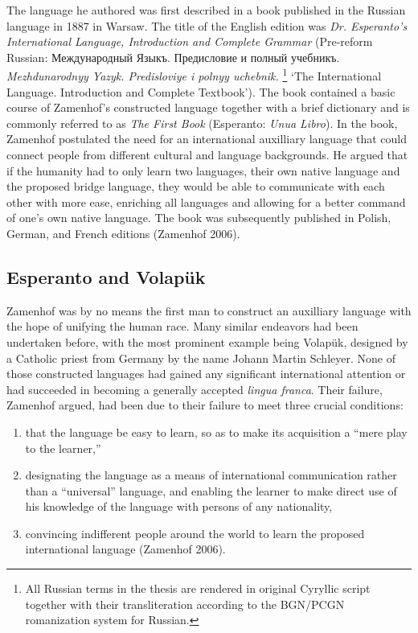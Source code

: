 The language he authored was first described in a book published in the Russian language in 1887 in Warsaw. The title of the English edition was \textit{Dr. Esperanto's International Language, Introduction and Complete Grammar} (Pre-reform Russian: Между\-на\-род\-ный Языкъ. Предисловие и полный учебникъ. \textit{Mezhdunarodnyy Yazyk. Predisloviye i polnyy uchebnik.}%
\footnote{All Russian terms in the thesis are rendered in original Cyryllic script together with their transliteration according to the BGN/PCGN romanization system for Russian.}
`The International Language. Introduction and Complete Textbook').
The book contained a basic course of Zamenhof's constructed language together with a brief dictionary and is commonly referred to as \textit{The First Book} (Esperanto: \textit{Unua Libro}).
In the book, Zamenhof postulated the need for an international auxilliary language that could connect people from different cultural and language backgrounds.
He argued that if the humanity had to only learn two languages, their own native language and the proposed bridge language, they would be able to communicate with each other with more ease, enriching all languages and allowing for a better command of one's own native language. The book was subsequently published in Polish, German, and French editions (Zamenhof 2006).

\subsection{Esperanto and Volapük}
Zamenhof was by no means the first man to construct an auxilliary language with the hope of unifying the human race.
Many similar endeavors had been undertaken before, with the most prominent example being Volapük, designed by a Catholic priest from Germany by the name Johann Martin Schleyer.
None of those constructed languages had gained any significant international attention or had succeeded in becoming a generally accepted \textit{lingua franca}.
Their failure, Zamenhof argued, had been due to their failure to meet three crucial conditions:

\begin{enumerate}
  \item that the language be easy to learn, so as to make its acquisition a ``mere play to the learner,''
  \item designating the language as a means of international communication rather than a ``universal'' language, and enabling the learner to make direct use of his knowledge of the language with persons of any nationality,
  \item convincing indifferent people around the world to learn the proposed international language (Zamenhof 2006).
\end{enumerate}

